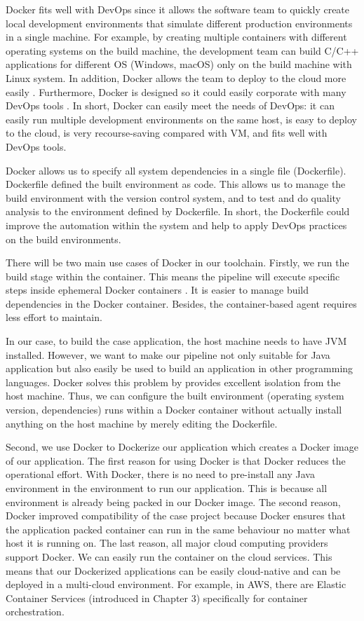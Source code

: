 Docker fits well with DevOps since it allows the software team to quickly create local development environments that simulate different production environments in a single machine. For example, by creating multiple containers with different operating systems on the build machine, the development team can build C/C++ applications for different OS (Windows, macOS) only on the build machine with Linux system.
In addition, Docker allows the team to deploy to the cloud more easily \cite{vaughan2014docker}. Furthermore, Docker is designed so it could easily corporate with many DevOps tools \cite{Whosusin96:online}. In short, Docker can easily meet the needs of DevOps: it can easily run multiple development environments on the same host, is easy to deploy to the cloud, is very recourse-saving compared with VM, and fits well with DevOps tools.
\par
Docker allows us to specify all system dependencies in a single file (Dockerfile). Dockerfile defined the built environment as code. This allows us to manage the build environment with the version control system, and to test and do quality analysis to the environment defined by Dockerfile. In short, the Dockerfile could improve the automation within the system and help to apply DevOps practices on the build environments.
\par
\label{docker}
There will be two main use cases of Docker in our toolchain. Firstly, we run the build stage within the container.
This means the pipeline will execute specific steps inside ephemeral Docker containers \cite{Overview44:online}. It is easier to manage build dependencies in the Docker container. Besides, the container-based agent requires less effort to maintain.
\par
In our case, to build the case application, the host machine needs to have JVM installed. However, we want to make our pipeline not only suitable for Java application but also easily be used to build an application in other programming languages. Docker solves this problem by provides excellent isolation from the host machine. Thus, we can configure the built environment (operating system version, dependencies) runs within a Docker container without actually install anything on the host machine by merely editing the Dockerfile.
\par
Second, we use Docker to Dockerize our application which creates a Docker image of our application. The first reason for using Docker is that Docker reduces the operational effort.
With Docker, there is no need to pre-install any Java environment in the environment to run our application. This is because all environment is already being packed in our Docker image. 
The second reason, Docker improved compatibility of the case project because Docker ensures that the application packed container can run in the same behaviour no matter what host it is running on.
The last reason, all major cloud computing providers support Docker. 
We can easily run the container on the cloud services. This means that our Dockerized applications can be easily cloud-native and can be deployed in a multi-cloud environment. For example, in AWS, there are Elastic Container Services (introduced in Chapter 3) specifically for container orchestration.
